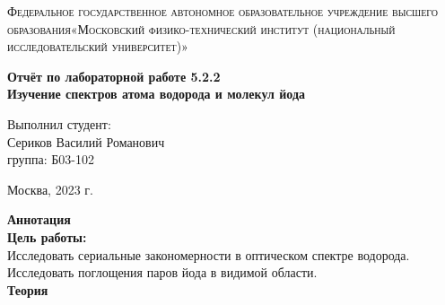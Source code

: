 \documentclass[a4paper, 12pt]{article}%
\begin{document}
	\begin{titlepage}
		\begin{center}
			\textsc{Федеральное государственное автономное образовательное учреждение высшего образования«Московский физико-технический институт (национальный исследовательский университет)»\\[5mm]
			}
			
			\vfill
			
			\textbf{Отчёт по лабораторной работе 5.2.2\\[3mm]
				Изучение спектров атома водорода и молекул йода
				\\[50mm]
			}
			
		\end{center}
		
		\hfill
		\begin{minipage}{.5\textwidth}
			Выполнил студент:\\[2mm]
			Сериков Василий Романович\\[2mm]
			группа: Б03-102\\[5mm]
			
		\end{minipage}
		\vfill
		\begin{center}
			Москва, 2023 г.
		\end{center}
		
	\end{titlepage}
	
	\newpage
	\setcounter{page}{2}
	\textbf{Аннотация}\\
	
	\textbf{Цель работы: }\\
	
	Исследовать сериальные закономерности в оптическом спектре водорода. Исследовать поглощения паров йода в видимой области.\\
	
	\textbf{Теория}\\  
	
\end{document}
